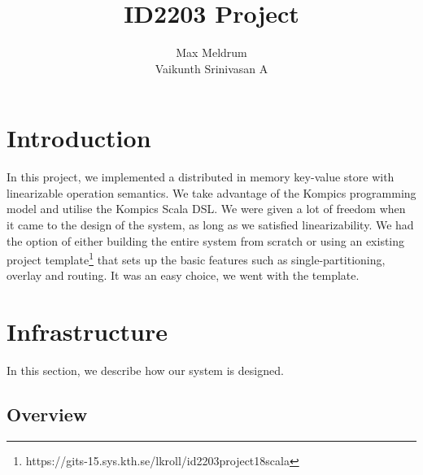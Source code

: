 \documentclass[12pt]{article}
\title{\textbf{ID2203 Project}}
\author{Max Meldrum\\
	Vaikunth Srinivasan A}
\date{}
\begin{document}
\maketitle

\section{Introduction}
In this project, we implemented a distributed in memory key-value store with linearizable operation semantics. We take advantage of the Kompics \cite{DBLP:conf/p2p/AradDH09} programming model and utilise the Kompics Scala DSL. We were given a lot of freedom when it came to the design of the system, as long as we satisfied linearizability. We had the option of either building the entire system from scratch or using an existing project template\footnote{https://gits-15.sys.kth.se/lkroll/id2203project18scala} that sets up the basic features such as single-partitioning, overlay and routing. It was an easy choice, we went with the template.

\section{Infrastructure}
In this section, we describe how our system is designed.

\subsection{Overview}
\end{document}

